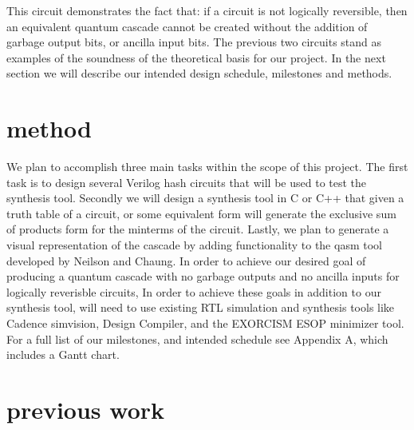 \documentclass{IEEEtran}
\begin{document}
This circuit demonstrates the fact that: if a circuit is not logically reversible, then an equivalent quantum cascade cannot be created without the addition of garbage output bits, or ancilla input bits.
The previous two circuits stand as examples of the soundness of the theoretical basis for our project. In the next section we will describe our intended design schedule, milestones and methods. 

\section{method}
We plan to accomplish three main tasks within the scope of this project. 
The first task is to design several Verilog hash circuits that will be used to test the synthesis tool.
Secondly we will design a synthesis tool in C or C++ that given a truth table of a circuit, or some equivalent form will generate the exclusive sum of products form for the minterms of the circuit.
Lastly, we plan to generate a visual representation of the cascade by adding functionality to the qasm tool developed by Neilson and Chaung. \cite{qasm2circ} 
In order to achieve our desired goal of producing a quantum cascade with no garbage outputs and no ancilla inputs for logically reverisble circuits, 
In order to achieve these goals in addition to our synthesis tool, will need to use existing RTL simulation and synthesis tools like Cadence simvision, Design Compiler, and the EXORCISM ESOP minimizer tool\cite{exorcism}. 
For a full list of our milestones, and intended schedule see Appendix A, which includes a Gantt chart. 

\section{previous work}
\end{document}
